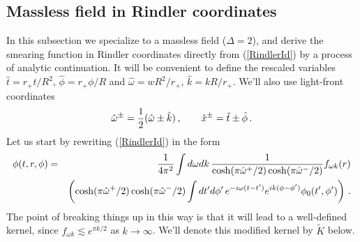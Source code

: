 \documentclass[12pt]{article}
\newcommand{\bea}{\begin{eqnarray}}
\newcommand{\eea}{\end{eqnarray}}
\newcommand{\hw}{\hat{\omega}}
\newcommand{\hk}{\hat{k}}
\newcommand{\htt}{\hat{t}}
\newcommand{\hp}{\hat{\phi}}
\newcommand{\hx}{\hat{x}}
\begin{document}
\subsection{Massless field in Rindler coordinates} \label{masslessrin}

In this subsection we specialize to a massless field ($\Delta = 2$),
and derive the smearing function in Rindler coordinates directly from
(\ref{RindlerId}) by a process of analytic continuation.  It will be
convenient to define the rescaled variables $\htt = r_+ t / R^2$, $\hp
= r_+ \phi / R$ and $\hw=wR^2/r_{+}$, $\hk=kR/r_{+}$. We'll also use
light-front coordinates
\[
\hw^\pm = {1 \over 2} (\hw \pm \hk) \, ,\qquad
\hx^\pm = \htt \pm \hp\,.
\]
Let us start by rewriting (\ref{RindlerId}) in the form
%
\bea
\label{RindlerId2}
\phi(t,r,\phi) & = & {1 \over 4 \pi^2} \int d\omega dk \, {1 \over \cosh (\pi \hw^+ / 2) \cosh (\pi \hw^-/2)} f_{\omega k}(r) \\
\nonumber
& & \left(\cosh (\pi \hw^+ / 2) \cosh (\pi \hw^-/2) \int dt' d\phi' \, e^{- i \omega (t - t')} e^{i k (\phi - \phi')}
\phi_0(t',\phi')\right)\,.
\eea
%
The point of breaking things up in this way is that it will lead to a
well-defined kernel, since $f_{\omega k} \lesssim e^{\pi k/2}$ as $k
\rightarrow \infty$.  We'll denote this modified kernel by $\tilde{K}$
below.
\end{document}
